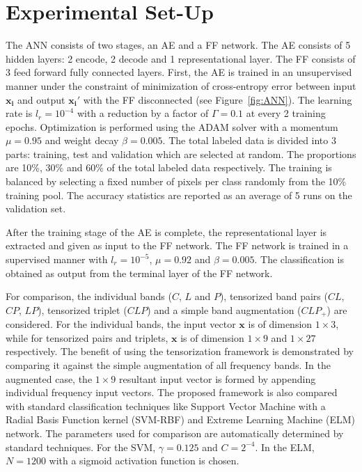 \section{Experimental Set-Up}
\label{sec:delta_911}
The ANN consists of two stages, an AE and a FF network. The AE consists of 5 hidden layers: 2 encode, 2 decode and 1 representational layer. The FF consists of 3 feed forward fully connected layers. First, the AE is trained in an unsupervised manner under the constraint of minimization of cross-entropy error between input $\bm{x_i}$ and output $\bm{x_i'}$ with the FF disconnected (see Figure~\ref{fig:ANN}). The learning rate is $l_r = 10^{-4}$ with a reduction by a factor of $\Gamma=0.1$ at every 2 training epochs. Optimization is performed using the ADAM solver with a momentum $\mu=0.95$ and weight decay $\beta=0.005$. The total labeled data is divided into 3 parts: training, test and validation which are selected at random. The proportions are 10\%, 30\% and 60\% of the total labeled data respectively. The training is balanced by selecting a fixed number of pixels per class randomly from the 10\% training pool.
The accuracy statistics are reported as an average of 5 runs on the validation set.  

After the training stage of the AE is complete, the representational layer is extracted and given as input to the FF network. The FF network is trained in a supervised manner with $l_r = 10^{-5}$, $\mu=0.92$ and $\beta=0.005$. The classification is obtained as output from the terminal layer of the FF network. 

For comparison, the individual bands ($C$, $L$ and $P$), tensorized band pairs ($CL$, $CP$, $LP$),  tensorized triplet ($CLP$) and a simple band augmentation ($CLP_{+}$) are considered. For the individual bands, the input vector $\bm{x}$ is of dimension $1\times3$, while for tensorized pairs and triplets,  $\bm{x}$ is of dimension $1\times9$ and $1\times27$ respectively. 
The benefit of using the tensorization framework is demonstrated by comparing it  against the simple augmentation of all frequency bands. In the augmented case, the $1\times9$ resultant input vector is formed by appending individual frequency input vectors. The proposed framework is also compared with standard classification techniques like Support Vector Machine with a Radial Basis Function kernel (SVM-RBF) and Extreme Learning Machine
(ELM) network. The parameters used for comparison are automatically determined by standard techniques. 
For the SVM, $\gamma=0.125$ and $C=2^{-4}$. In the ELM, $N=1200$ with a sigmoid activation function is chosen.

